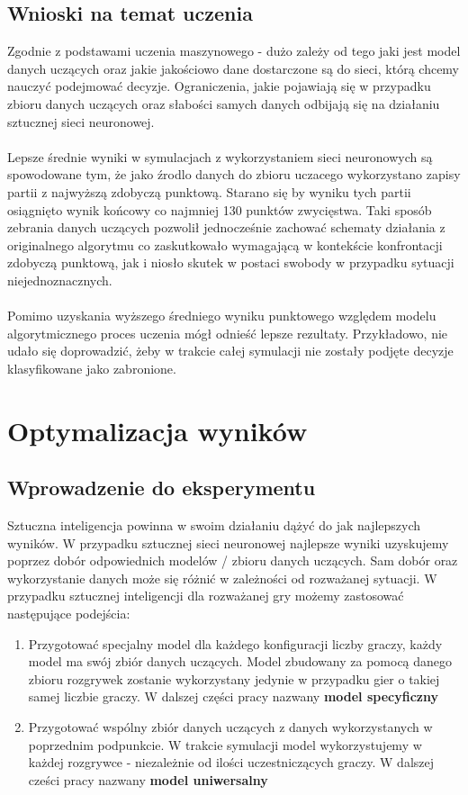 \documentclass[12pt, oneside]{report}
\begin{document}
\section{Wnioski na temat uczenia}
Zgodnie z podstawami uczenia maszynowego - dużo zależy od tego jaki jest model danych uczących oraz jakie jakościowo dane dostarczone są do sieci, którą chcemy nauczyć podejmować decyzje. Ograniczenia, jakie pojawiają się w przypadku zbioru danych uczących oraz słabości samych danych odbijają się na działaniu sztucznej sieci neuronowej. \\ \\ 
Lepsze średnie wyniki w symulacjach z wykorzystaniem sieci neuronowych są spowodowane tym, że jako źrodlo danych do zbioru uczacego wykorzystano zapisy partii z najwyższą zdobyczą punktową. Starano się by wyniku tych partii osiągnięto wynik końcowy co najmniej 130 punktów zwycięstwa. Taki sposób zebrania danych uczących pozwolił jednocześnie zachować schematy działania z originalnego algorytmu co zaskutkowało wymagającą w kontekście konfrontacji zdobyczą punktową, jak i niosło skutek w postaci swobody w przypadku sytuacji niejednoznacznych. \\ \\
Pomimo uzyskania wyższego średniego wyniku punktowego względem modelu algorytmicznego proces uczenia mógł odnieść lepsze rezultaty. Przykładowo, nie udało się doprowadzić, żeby w trakcie całej symulacji nie zostały podjęte decyzje klasyfikowane jako zabronione. 
\chapter{Optymalizacja wyników}
\section{Wprowadzenie do eksperymentu}
Sztuczna inteligencja powinna w swoim działaniu dążyć do jak najlepszych wyników. W przypadku sztucznej sieci neuronowej najlepsze wyniki uzyskujemy poprzez dobór odpowiednich modelów / zbioru danych uczących. Sam dobór oraz wykorzystanie danych może się różnić w zależności od rozważanej sytuacji. W przypadku sztucznej inteligencji dla rozważanej gry możemy zastosować następujące podejścia:

\begin{enumerate}
	\item Przygotować specjalny model dla każdego konfiguracji liczby graczy, każdy model ma swój zbiór danych uczących. Model zbudowany za pomocą danego zbioru rozgrywek zostanie wykorzystany jedynie w przypadku gier o takiej samej liczbie graczy. W dalszej części pracy nazwany \textbf{model specyficzny}
	\item Przygotować wspólny zbiór danych uczących z danych wykorzystanych w poprzednim podpunkcie. W trakcie symulacji model wykorzystujemy w każdej rozgrywce - niezależnie od ilości uczestniczących graczy. W dalszej cześci pracy nazwany \textbf{model uniwersalny}
\end{enumerate}
\end{document}
